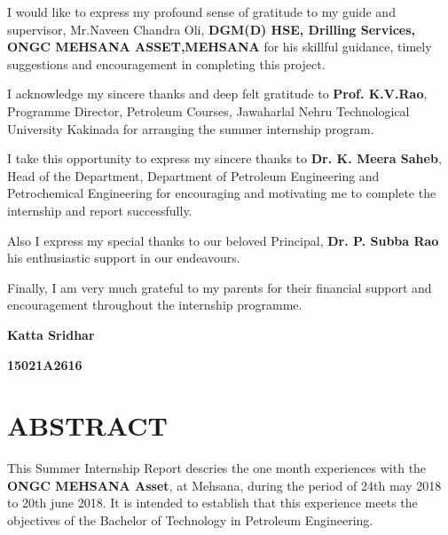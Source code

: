 \documentclass[11pt,a4paper]{report}
\begin{document}
I would like to express my profound sense of gratitude to my guide and supervisor, Mr.Naveen Chandra Oli, \textbf{DGM(D) HSE, Drilling Services, ONGC MEHSANA ASSET,MEHSANA} for his skillful guidance, timely suggestions and encouragement in completing this project.

\vspace{1em}


I acknowledge my sincere thanks and deep felt gratitude to \textbf{Prof. K.V.Rao}, Programme Director, Petroleum Courses, Jawaharlal Nehru Technological University Kakinada for arranging the summer internship program.

\vspace{1em}

I take this opportunity to express my sincere thanks to \textbf{Dr. K. Meera Saheb}, Head of the Department, Department of Petroleum Engineering and Petrochemical Engineering for encouraging and motivating me to complete the internship and report successfully.

\vspace{1em}

Also I express my special thanks to our beloved Principal, \textbf{Dr. P. Subba Rao} his enthusiastic support in our endeavours.

\vspace{1em}

Finally, I am very much grateful to my parents for their financial support and encouragement throughout the internship programme.

\vspace{1em}

\hfill \textbf{Katta Sridhar}

\hfill \textbf{15021A2616} \hspace{0.005\textwidth}

\newpage

\tableofcontents


\newpage

\section*{\centering ABSTRACT}


This  Summer Internship Report  descries the one month experiences with the \textbf{ONGC MEHSANA Asset}, at Mehsana,
during the period of 24th may 2018 to 20th june 2018. It is  intended to  establish that this  experience 
meets  the  objectives  of the Bachelor of Technology in Petroleum Engineering.
\end{document}
